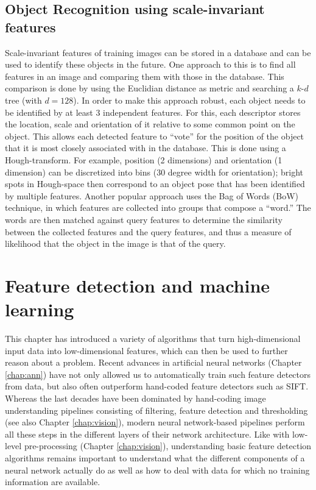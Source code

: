 \subsection{Object Recognition using scale-invariant features}
Scale-invariant features of training images can be stored in a database and can be used to identify these objects in the future. One approach to this is to find all features in an image and comparing them with those in the database. This comparison is done by using the Euclidian distance as metric and searching a $k$-$d$ tree (with $d=128$). In order to make this approach robust, each object needs to be identified by at least 3 independent features. For this, each descriptor stores the location, scale and orientation of it relative to some common point on the object. This allows each detected feature to ``vote'' for the position of the object that it is most closely associated with in the database.  This is done using a Hough-transform. For example, position (2 dimensions) and orientation (1 dimension) can be discretized into bins (30 degree width for orientation); bright spots in Hough-space then correspond to an object pose that has been identified by multiple features. Another popular approach uses the Bag of Words (BoW) technique, in which features are collected into groups that compose a ``word.'' The words are then matched against query features to determine the similarity between the collected features and the query features, and thus a measure of likelihood that the object in the image is that of the query.

\section{Feature detection and machine learning}
This chapter has introduced a variety of algorithms that turn high-dimensional input data into low-dimensional features, which can then be used to further reason about a problem. Recent advances in artificial neural networks (Chapter \ref{chap:ann}) have not only allowed us to automatically train such feature detectors from data, but also often outperform hand-coded feature detectors such as SIFT. Whereas the last decades have been dominated by hand-coding image understanding pipelines consisting of filtering, feature detection and thresholding (see also Chapter \ref{chap:vision}), modern neural network-based pipelines perform all these steps in the different layers of their network architecture. Like with low-level pre-processing (Chapter \ref{chap:vision}), understanding basic feature detection algorithms remains important to understand what the different components of a neural network actually do as well as how to deal with data for which no training information are available. 

